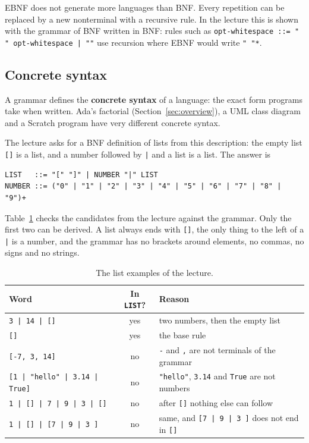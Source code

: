EBNF does not generate more languages than BNF. Every repetition can be
replaced by a new nonterminal with a recursive rule. In the lecture this is
shown with the grammar of BNF written in BNF: rules such as
\lstinline{opt-whitespace ::= " " opt-whitespace | ""} use recursion where EBNF
would write \lstinline{" "*}.

\subsection{Concrete syntax}

A grammar defines the \textbf{concrete syntax} of a language: the exact form
programs take when written. Ada's factorial (Section~\ref{sec:overview}), a
UML class diagram and a Scratch program have very different concrete syntax.

The lecture asks for a BNF definition of lists from this description: the
empty list \texttt{[]} is a list, and a number followed by \texttt{|} and a list
is a list. The answer is
\begin{lstlisting}
LIST   ::= "[" "]" | NUMBER "|" LIST
NUMBER ::= ("0" | "1" | "2" | "3" | "4" | "5" | "6" | "7" | "8" | "9")+
\end{lstlisting}
Table~\ref{tab:lists} checks the candidates from the lecture against the
grammar. Only the first two can be derived. A list always ends with
\texttt{[]}, the only thing to the left of a \texttt{|} is a number, and the
grammar has no brackets around elements, no commas, no signs and no strings.

\begin{table}[h]
\centering
\small
\begin{tabular}{l c l}
  \toprule
  Word & In \texttt{LIST}? & Reason \\
  \midrule
  \texttt{3 | 14 | []}                        & yes & two numbers, then the empty list \\
  \texttt{[]}                                 & yes & the base rule \\
  \texttt{[-7, 3, 14]}                        & no  & \texttt{-} and \texttt{,} are not terminals of the grammar \\
  \texttt{[1 | "hello" | 3.14 | True]}        & no  & \texttt{"hello"}, \texttt{3.14} and \texttt{True} are not numbers \\
  \texttt{1 | [] | 7 | 9 | 3 | []}            & no  & after \texttt{[]} nothing else can follow \\
  \texttt{1 | [] | [7 | 9 | 3 ]}              & no  & same, and \texttt{[7 | 9 | 3 ]} does not end in \texttt{[]} \\
  \bottomrule
\end{tabular}
\caption{The list examples of the lecture.}
\label{tab:lists}
\end{table}

